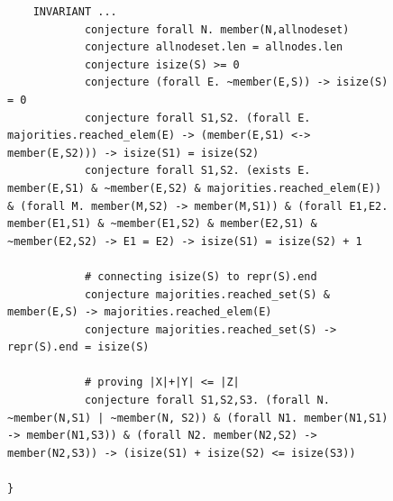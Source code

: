 {\begin{figure}
\begin{scriptsize}
\begin{verbatim}
    INVARIANT ...
            conjecture forall N. member(N,allnodeset)
            conjecture allnodeset.len = allnodes.len
            conjecture isize(S) >= 0
            conjecture (forall E. ~member(E,S)) -> isize(S) = 0
            conjecture forall S1,S2. (forall E. majorities.reached_elem(E) -> (member(E,S1) <-> member(E,S2))) -> isize(S1) = isize(S2)
            conjecture forall S1,S2. (exists E. member(E,S1) & ~member(E,S2) & majorities.reached_elem(E)) & (forall M. member(M,S2) -> member(M,S1)) & (forall E1,E2. member(E1,S1) & ~member(E1,S2) & member(E2,S1) & ~member(E2,S2) -> E1 = E2) -> isize(S1) = isize(S2) + 1

            # connecting isize(S) to repr(S).end
            conjecture majorities.reached_set(S) & member(E,S) -> majorities.reached_elem(E)
            conjecture majorities.reached_set(S) -> repr(S).end = isize(S)

            # proving |X|+|Y| <= |Z|
            conjecture forall S1,S2,S3. (forall N. ~member(N,S1) | ~member(N, S2)) & (forall N1. member(N1,S1) -> member(N1,S3)) & (forall N2. member(N2,S2) -> member(N2,S3)) -> (isize(S1) + isize(S2) <= isize(S3))

}
\end{verbatim}
\end{scriptsize}
\end{figure}
}

